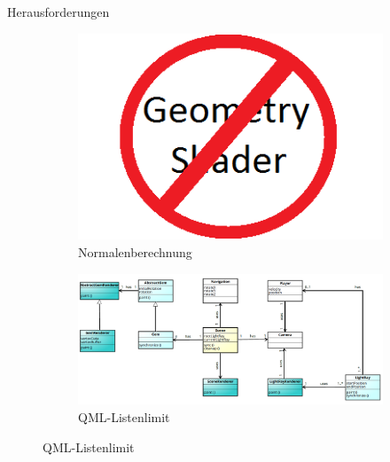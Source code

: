 \slideonetoone
{Herausforderungen}
{	
	\begin{figure}
		\centering
		\begin{subfigure}{\textwidth}
			\centering
			\includegraphics[width=\textwidth, height=0.3\textheight, keepaspectratio]{images/nogeometry}
			\caption{Normalenberechnung}
		\end{subfigure}
		\begin{subfigure}{\textwidth}
			\centering
			\includegraphics[width=\textwidth, height=0.3\textheight, keepaspectratio]{images/klassendiagramm}
			\caption{QML-Listenlimit}
		\end{subfigure}
	\end{figure}
}
